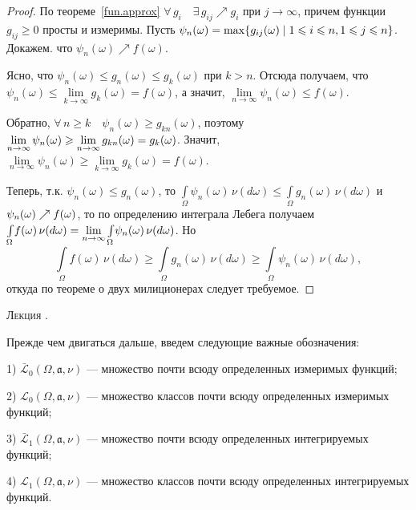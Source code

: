 \documentclass[12pt,titlepage]{article}
\newcounter{lec}
\renewcommand{\thelec}{\arabic{lec}}
\newcommand*{\lecture}{\refstepcounter{lec}\vspace{20pt}
\begin{center}{\rmfamily\textsc{Лекция \thelec.}}
\end{center}}
\theoremstyle{definition}
\newcommand*{\p}[1]{#1\nobreak\discretionary{}{\hbox{$\mathsurround=0pt #1$}}{}}
\begin{document}
\begin{proof}
По теореме~\ref{fun.approx} $\forall\, g_i\quad \exists\,
g_{ij}\nearrow g_i$ при $j\to\infty$, причем функции
$g_{ij}\geqslant 0$ просты и измеримы. Пусть
$\psi_n(\omega)=\max\{g_{ij}(\omega)\mid 1\leqslant i\p\leqslant
n,1\leqslant j\leqslant n\}$. Докажем. что $\psi_n(\omega)\nearrow
f(\omega)$.

Ясно, что $\psi_n(\omega)\leqslant g_n(\omega)\leqslant g_k(\omega)$
при $k>n$. Отсюда получаем, что $\psi_n(\omega)\leqslant
\lim\limits_{k\to\infty} g_k(\omega)=f(\omega)$, а значит,
$\lim\limits_{n\to\infty} \psi_n(\omega)\leqslant f(\omega)$.

Обратно, $\forall\, n\geqslant k\quad \psi_n(\omega)\geqslant
g_{kn}(\omega)$, поэтому
$\lim\limits_{n\to\infty}\psi_n(\omega)\geqslant\lim\limits_{n\to\infty}
g_{kn}(\omega)\p=g_k(\omega)$. Значит,
$\lim\limits_{n\to\infty}\psi_n(\omega)\geqslant\lim\limits_{k\to\infty}
g_k(\omega)=f(\omega)$.

Теперь, т.к. $\psi_n(\omega)\leqslant g_n(\omega)$, то
$\int\limits_\Omega\! \psi_n(\omega)\,\nu(d\omega)\leqslant
\int\limits_\Omega\! g_n(\omega)\,\nu(d\omega)$ и $\psi_n(\omega)
\p\nearrow f(\omega)$, то по определению интеграла Лебега получаем
$\int\limits_\Omega\!
f(\omega)\,\nu(d\omega)\p=\lim\limits_{n\to\infty}
\int\limits_\Omega\! \psi_n(\omega)\,\nu(d\omega)$. Но
$$\int\limits_\Omega\! f(\omega)\,\nu(d\omega)\geqslant
\int\limits_\Omega\! g_n(\omega)\,\nu(d\omega)\geqslant
\int\limits_\Omega\! \psi_n(\omega)\,\nu(d\omega),$$ откуда по
теореме о двух милиционерах следует требуемое.
\end{proof}

\lecture

Прежде чем двигаться дальше, введем следующие важные обозначения:

1) $\mathcal{\bar{L}}_0(\Omega,\mathfrak{a},\nu)$  --- множество
почти всюду определенных измеримых функций;

2) $\mathcal{L}_0(\Omega,\mathfrak{a},\nu)$  --- множество классов
почти всюду определенных измеримых функций;

3) $\mathcal{\bar{L}}_1(\Omega,\mathfrak{a},\nu)$  --- множество
почти всюду оп\-ределенных интегрируемых функций;

4) $\mathcal{L}_1(\Omega,\mathfrak{a},\nu)$  --- множество классов
почти всюду определенных интегрируемых функций.
\end{document}
